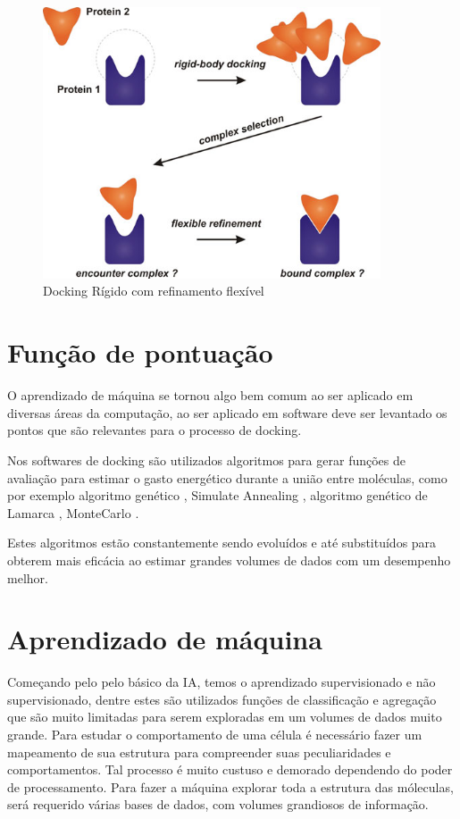 \documentclass[tcc, capa]{texucpel}
\begin{document}
      \begin{figure}[!htb]
	\centering\includegraphics[width=10cm]{imagens/rigid_flexible.jpg}
	\caption{Docking Rígido com refinamento flexível}
	\end{figure}


\section{Função de pontuação}

O aprendizado de máquina se tornou algo bem comum ao ser aplicado em diversas áreas da computação, ao ser aplicado em software deve ser levantado os pontos que são relevantes para o processo de docking.

Nos softwares de docking são utilizados algoritmos para gerar funções de avaliação para estimar o gasto energético durante a união entre moléculas, como por exemplo algoritmo genético \cite{holland1975adaptation}, Simulate Annealing \cite{kirkpatrick1984optimization} ,  algoritmo genético de Lamarca \cite{morris1998automated},  MonteCarlo \cite{caflisch1992monte}.

Estes algoritmos estão constantemente sendo evoluídos e até substituídos para obterem mais eficácia ao estimar grandes volumes de dados com um desempenho melhor.

\section{Aprendizado de máquina }

Começando pelo pelo básico da IA, temos o aprendizado supervisionado e não supervisionado, dentre estes são utilizados funções de classificação e agregação que são muito limitadas para serem exploradas em um volumes de dados muito grande.
Para estudar o comportamento de uma célula é necessário fazer um mapeamento de sua estrutura para compreender suas peculiaridades e comportamentos. Tal processo é muito custuso e demorado dependendo do poder de processamento. 
Para fazer a máquina explorar toda a estrutura das móleculas, será requerido várias  bases de dados, com volumes grandiosos de informação. 
\end{document}
